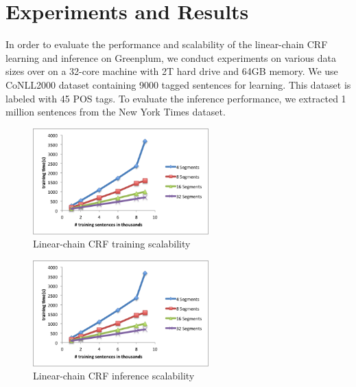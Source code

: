 \documentclass[11pt,letterpaper]{article}
\begin{document}




\section{Experiments and Results}
In order to evaluate the performance and scalability of the linear-chain CRF learning and inference on Greenplum,
we conduct experiments on various data sizes over on a 32-core machine with 2T hard drive and 64GB memory.
We use CoNLL2000 dataset containing 9000 tagged sentences for learning. 
This dataset is labeled with 45 POS tags.
To evaluate the inference performance, we extracted 1 million sentences from the New York Times dataset. 

\begin{figure}
\centering
\includegraphics[height=11em]{training}
\caption{Linear-chain CRF training scalability}
\label{fig:crftrain}
\end{figure}

\begin{figure}
\centering
\includegraphics[height=11em]{training}
\caption{Linear-chain CRF inference scalability}
\label{fig:crftrain}
\end{figure}
\end{document}

